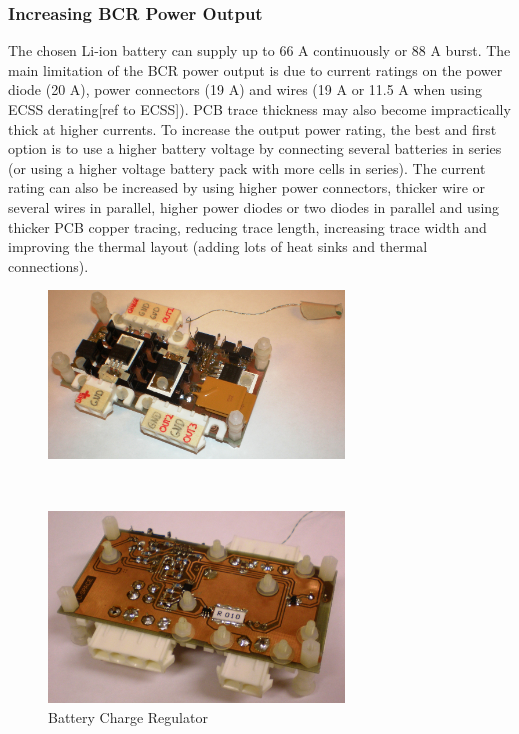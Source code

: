 \subsubsection*{Increasing BCR Power Output}
The chosen Li-ion battery can supply up to 66 A continuously or 88 A burst. The main limitation of the \ac{BCR} power output is due to current ratings on the power diode (20 A), power connectors (19 A) and wires (19 A or 11.5 A when using ECSS derating[ref to ECSS]). PCB trace thickness may also become impractically thick at higher currents. 
To increase the output power rating, the best and first option is to use a higher battery voltage by connecting several batteries in series (or using a higher voltage battery pack with more cells in series). 
The current rating can also be increased by using higher power connectors, thicker wire or several wires in parallel, higher power diodes or two diodes in parallel and using thicker PCB copper tracing, reducing trace length, increasing trace width and improving the thermal layout (adding lots of heat sinks and thermal connections).
%
%
%
\begin{figure}[H]
\begin{minipage}[t]{\linewidth}
\centering
\includegraphics[width=0.7\textwidth]{figures/fig_BCR_top}
\end{minipage}
\\[1mm]
\begin{minipage}[t]{\linewidth}
\centering
\includegraphics[width=0.7\textwidth]{figures/fig_BCR_bottom}
\end{minipage}
\caption{Battery Charge Regulator}
\label{fig:BCR_top_bottom}
\end{figure}
